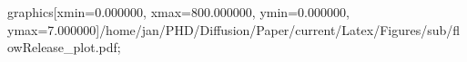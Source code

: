 graphics[xmin=0.000000, xmax=800.000000, ymin=0.000000, ymax=7.000000]{/home/jan/PHD/Diffusion/Paper/current/Latex/Figures/sub/flowRelease_plot.pdf}; 
